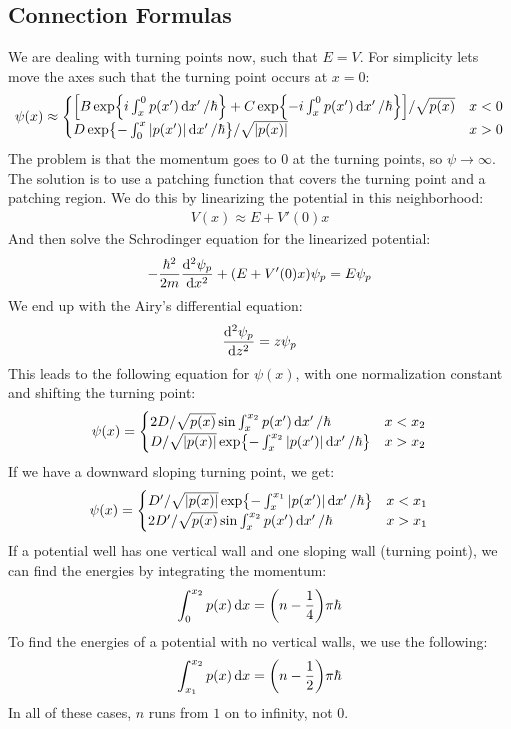 \subsection{Connection Formulas}
We are dealing with turning points now, such that $E=V$. For simplicity lets move the axes such that the turning point occurs at $x=0$:
\begin{align*}
  \psi(x)\approx
  \begin{cases}
    \qty[B\exp{i\int_x^0p(x')\dd{x'}/\hbar}+C\exp{-i\int_x^0p(x')\dd{x'}/\hbar}]/
    \sqrt{p(x)}
    & x < 0 \\
    D\exp{-\int_0^x\abs{p(x')}\dd{x'}/\hbar}/\sqrt{\abs{p(x)}}
    & x > 0
  \end{cases}
\end{align*}
The problem is that the momentum goes to $0$ at the turning points, so $\psi\to\infty$. The solution is to use a patching function that covers the turning point and a patching region. We do this by linearizing the potential in this neighborhood:
\begin{align*}
  V(x)\approx E+V'(0)x
\end{align*}
And then solve the Schrodinger equation for the linearized potential:
\begin{align*}
  -\frac{\hbar^2}{2m}\dv[2]{\psi_p}{x}+(E+V'(0)x)\psi_p=E\psi_p
\end{align*}
We end up with the Airy's differential equation:
\begin{align*}
  \dv[2]{\psi_p}{z}=z\psi_p
\end{align*}
This leads to the following equation for $\psi(x)$, with one normalization constant and shifting the turning point:
\begin{align*}
  \psi(x)=
  \begin{cases}
    2D/\sqrt{p(x)}\sin\int_x^{x_2}p(x')\dd{x'}/\hbar & x < x_2 \\
    D/\sqrt{\abs{p(x)}}\exp{-\int_x^{x_2}\abs{p(x')}\dd{x'}/\hbar} & x > x_2
  \end{cases}
\end{align*}
If we have a downward sloping turning point, we get:
\begin{align*}
  \psi(x)=
  \begin{cases}
    D'/\sqrt{\abs{p(x)}}\exp{-\int_x^{x_1}\abs{p(x')}\dd{x'}/\hbar} & x < x_1\\
    2D'/\sqrt{p(x)}\sin\int_x^{x_2}p(x')\dd{x'}/\hbar & x > x_1
  \end{cases}
\end{align*}
If a potential well has one vertical wall and one sloping wall (turning point), we can find the energies by integrating the momentum:
\begin{align*}
  \int_0^{x_2}p(x)\dd{x}=\qty(n-\frac{1}{4})\pi\hbar
\end{align*}
To find the energies of a potential with no vertical walls, we use the following:
\begin{align*}
  \int_{x_1}^{x_2}p(x)\dd{x}=\qty(n-\frac{1}{2})\pi\hbar
\end{align*}
In all of these cases, $n$ runs from $1$ on to infinity, not $0$.
